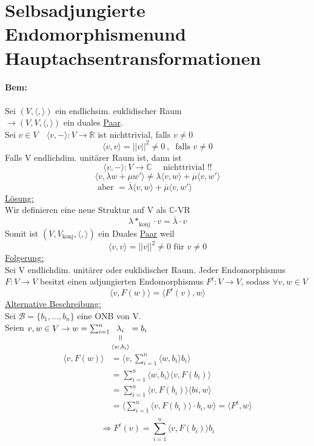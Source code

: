 \documentclass[titlepage,12pt,a4paper,ngerman]{report}
\newcommand{\verteq}{\rotatebox{90}{$\,=$}}
\newcommand{\equalto}[2]{\underset{\scriptstyle\overset{\mkern4mu\verteq}{#2}}{#1}}
\newcommand{\tx}[1]{\textrm{#1}}
\begin{document}
\chapter{Selbsadjungierte Endomorphismenund Hauptachsentransformationen}
\subsubsection{Bem:}
Sei $ (V, \langle , \rangle) $ ein endlichsim. euklidischer Raum\\
$ \rightarrow (V,V,\langle,\rangle)$ ein duales \underline{Paar}.\\
Sei $ v\in V \quad \langle v, - \rangle : V \to \mathbb{R} $ ist nichttrivial, falls $ v \neq 0 $
$$ \langle v,v \rangle = ||v||^2 \neq 0\ , \ \tx{ falls } v \neq 0$$
Falls V endlichdim. unitärer Raum ist, dann ist 
$$ \langle v,-\rangle : V \to \mathbb{C} \quad \tx{ nichttrivial !!} $$
$$ \langle v, \lambda w + \mu w' \rangle \neq \lambda \langle v,w \rangle + \mu \langle v, w' \rangle$$
$$ \tx{aber } = \overline{\lambda} \langle v,w \rangle + \overline{\mu} \langle v, w'\rangle \qquad \quad $$
\underline{Lösung:}\\
Wir definieren eine neue Struktur auf V als $ \mathbb{C} $-VR
$$ \lambda *_{\tx{konj}} \cdot v = \overline{\lambda} \cdot v $$
Somit ist $ (V,V_{\tx{konj}}, \langle,\rangle) $ ein Duales \underline{Paar} weil 
$$ \langle v,v \rangle = ||v||^2 \neq 0 \tx{ für } v \neq 0$$
\underline{Folgerung:}\\
Sei V endlichdim. unitärer oder euklidischer Raum. Jeder Endomorphismus $ F: V \to V $ besitzt einen adjungierten Endomorphismus $ F^t: V \to V $, sodass $ \forall v,w \in V  $\\
$$ \langle v, F(w)\rangle = \langle F^t(v) , w \rangle$$
\underline{Alternative Beschreibung:}\\
Sei $ \mathcal{B}= \{b_1,\dots , b_n  \} $ eine ONB von V.\\
Seien $ v,w \in V \rightarrow w = \sum_{i=1}^{n} \equalto{\lambda _i}{\langle w, b_i \rangle} = b_i $
\begin{align*}
\langle v, F(w) \rangle &= \langle v , \sum_{i=1}^{n} \langle w, b_i \rangle b_i \rangle\\
&= \sum_{i=1}^{n} \overline{ \langle w, b_i \rangle } \langle v, F(b_i) \rangle \\
&= \sum_{i=1}^{n} \langle v, F(b_i) \rangle \langle bi , w \rangle\\
&= \langle \sum_{i=1}^{n} \langle v, F(b_i)\rangle \cdot b_i , w \rangle = \langle F^t, w \rangle\\
\end{align*}
$$ \Rightarrow F^t(v) = \sum_{i=1}^{n} \langle v, F(b_i)\rangle b_i$$
\end{document}
